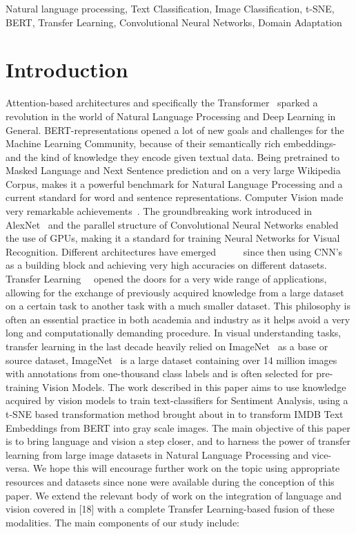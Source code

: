 \documentclass[conference]{IEEEtran}
\begin{document}
\begin{IEEEkeywords}
Natural language processing, Text Classification, Image Classification, t-SNE, BERT, Transfer Learning, Convolutional Neural Networks, Domain Adaptation
\end{IEEEkeywords}

\section{Introduction}
Attention-based architectures and specifically the Transformer~\cite{attention} sparked a revolution in the world of Natural Language Processing and Deep Learning in General. BERT-representations \cite{Bert} opened a lot of new goals and challenges for the Machine Learning Community, because of their semantically rich embeddings- and the kind of knowledge they encode given textual data. Being pretrained to Masked Language and Next Sentence prediction and on a very large Wikipedia Corpus, makes it a powerful benchmark for Natural Language Processing and a current standard for word and sentence representations. Computer Vision made very remarkable achievements~\cite{visionsurvey}. The groundbreaking work introduced in AlexNet~\cite{alexnet} and the parallel structure of Convolutional Neural Networks enabled the use of GPUs, making it a standard for training Neural Networks for Visual Recognition. Different architectures have emerged~\cite{alexnet}~\cite{shufflenetv2}~\cite{vgg16}~\cite{resnet}~\cite{resnext} since then using CNN's as a building block and achieving very high accuracies on different datasets. Transfer Learning~\cite{transferlearning}~\cite{transferlearningreminder} opened the doors for a very wide range of applications, allowing for the exchange of previously acquired knowledge from a large dataset on a certain task to another task with a much smaller dataset. This philosophy is often an essential practice in both academia and industry as it helps avoid a very long and computationally demanding procedure. In visual understanding tasks, transfer learning in the last decade heavily relied on ImageNet~\cite{imagenet} as a base or source dataset, ImageNet~\cite{imagenet} is a large dataset containing over 14 million images with annotations from one-thousand class labels and is often selected for pre-training Vision Models. The work described in this paper aims to use knowledge acquired by vision models to train text-classifiers for Sentiment Analysis, using a t-SNE based transformation method brought about in \cite{deepinsight} to transform IMDB Text Embeddings from BERT into gray scale images. The main objective of this paper is to bring language and vision a step closer, and to harness the power of transfer learning from large image datasets in Natural Language Processing and vice-versa. We hope this will encourage further work on the topic using appropriate resources and datasets since none were available during the conception of this paper. We extend the relevant body of work on the integration of language and vision covered in [18] with a complete Transfer Learning-based fusion of these modalities. The main components of our study include:
\end{document}
